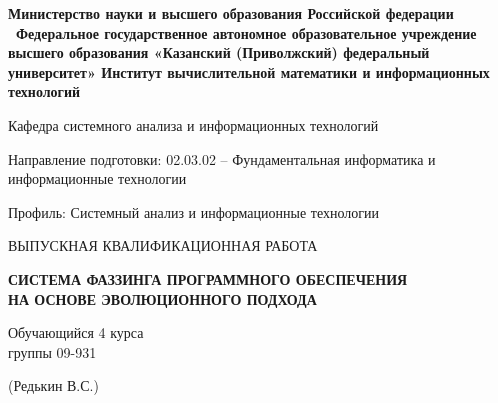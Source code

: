 \begin{titlepage}
	\begin{singlespace}
	\setlength{\abovedisplayskip}{0pt}
	\setlength{\belowdisplayskip}{0pt}
	\begin{center}
		\fontsize{13}{15}\bf\selectfont
		Министерство науки и высшего образования Российской федерации
\
		Федеральное государственное автономное образовательное учреждение\\высшего образования «Казанский (Приволжский) федеральный университет»
		\fontsize{13}{15}\normalfont\selectfont Институт вычислительной математики и информационных технологий
	\end{center}
	\vspace{-0.8cm}
	\begin{center}
		\fontsize{13}{15}\selectfont Кафедра системного анализа и информационных технологий
	\end{center}
	\vspace{5pt}
	\begin{center}
		\fontsize{13}{15}\selectfont Направление подготовки: 02.03.02 -- Фундаментальная информатика и информационные технологии
	\end{center}
	\vspace{-0.6cm}
	\begin{center}
		\fontsize{13}{15}\selectfont Профиль: Системный анализ и информационные технологии
	\end{center}
	\vspace{1cm}
	\begin{center}
		\fontsize{14}{21}\selectfont
		\MakeUppercase{выпускная квалификационная работа}
		
		\bf \MakeUppercase{Система фаззинга программного обеспечения \\ на основе эволюционного подхода}
	\end{center}

	\end{singlespace}

	\vspace{2.1cm}

	\begin{center}
		\begin{minipage}{\textwidth}
			\begin{minipage}{0.40\textwidth}
				\begin{singlespace}
					\fontsize{13}{13}\selectfont
					Обучающийся 4 курса \\
					группы 09-931
				\end{singlespace}
			\end{minipage}
			\begin{minipage}{0.60\textwidth}
				\fontsize{13}{13}\selectfont
				\vspace{\baselineskip}
				\hfill (Редькин В.С.)
			\end{minipage}
		\end{minipage}
	

\end{center}
\end{titlepage}
